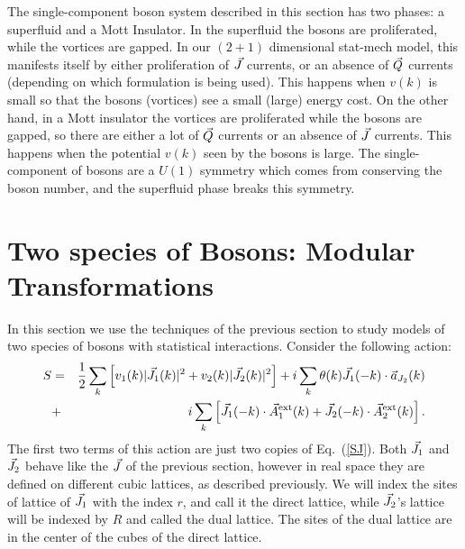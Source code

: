 The single-component boson system described in this section has two phases: a superfluid and a Mott Insulator. In the superfluid the bosons are proliferated, while the vortices are gapped. In our $(2+1)$ dimensional stat-mech model, this manifests itself by either proliferation of $\vec{J}$ currents, or an absence of $\vec{Q}$ currents (depending on which formulation is being used). This happens when $v(k)$ is small so that the bosons (vortices) see a small (large) energy cost. On the other hand, in a Mott insulator the vortices are proliferated while the bosons are gapped, so there are either a lot of $\vec{Q}$ currents or an absence of $\vec{J}$ currents. This happens when the potential $v(k)$ seen by the bosons is large. The single-component of bosons are a $U(1)$ symmetry which comes from conserving the boson number, and the superfluid phase breaks this symmetry.

\section{Two species of Bosons: Modular Transformations}
\label{section::modular}
In this section we use the techniques of the previous section to study models of two species of bosons with statistical interactions.\cite{short_range3,Gen2Loops,FQHE} Consider the following action:
\begin{eqnarray}
S&=&\frac{1}{2}\sum_k \left[v_1(k)|\vec{J}_1(k)|^2+v_2(k)|\vec{J}_2(k)|^2\right]
+i\sum_k \theta(k)\vec{J}_1(-k)\cdot \vec{a}_{J_2}(k)\nonumber\\
&+&i\sum_k \left[ \vec{J}_1(-k)\cdot \vec{A}_{1}^{\rm ext}(k) + \vec{J}_2(-k)\cdot \vec{A}_{2}^{\rm ext}(k) \right].
\label{kaction_1}
\end{eqnarray}
The first two terms of this action are just two copies of Eq.~(\ref{SJ}). Both $\vec{J}_1$ and $\vec{J}_2$ behave like the $\vec{J}$ of the previous section, however in real space they are defined on different cubic lattices, as described previously. We will index the sites of lattice of $\vec{J}_1$ with the index $r$, and call it the direct lattice, while $\vec{J}_2$'s lattice will be indexed by $R$ and called the dual lattice. The sites of the dual lattice are in the center of the cubes of the direct lattice.

